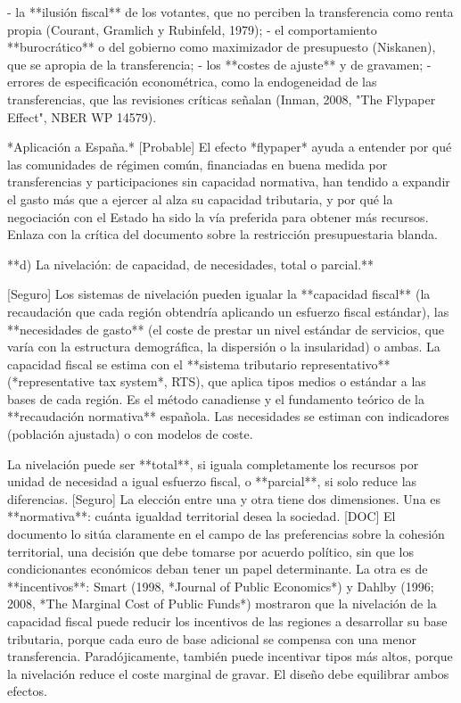 \documentclass[10pt,a4paper]{article}
\begin{document}
- la **ilusión fiscal** de los votantes, que no perciben la transferencia como renta propia (Courant, Gramlich y Rubinfeld, 1979);
- el comportamiento **burocrático** o del gobierno como maximizador de presupuesto (Niskanen), que se apropia de la transferencia;
- los **costes de ajuste** y de gravamen;
- errores de especificación econométrica, como la endogeneidad de las transferencias, que las revisiones críticas señalan (Inman, 2008, "The Flypaper Effect", NBER WP 14579).

*Aplicación a España.* [Probable] El efecto *flypaper* ayuda a entender por qué las comunidades de régimen común, financiadas en buena medida por transferencias y participaciones sin capacidad normativa, han tendido a expandir el gasto más que a ejercer al alza su capacidad tributaria, y por qué la negociación con el Estado ha sido la vía preferida para obtener más recursos. Enlaza con la crítica del documento sobre la restricción presupuestaria blanda.

**d) La nivelación: de capacidad, de necesidades, total o parcial.**

[Seguro] Los sistemas de nivelación pueden igualar la **capacidad fiscal** (la recaudación que cada región obtendría aplicando un esfuerzo fiscal estándar), las **necesidades de gasto** (el coste de prestar un nivel estándar de servicios, que varía con la estructura demográfica, la dispersión o la insularidad) o ambas. La capacidad fiscal se estima con el **sistema tributario representativo** (*representative tax system*, RTS), que aplica tipos medios o estándar a las bases de cada región. Es el método canadiense y el fundamento teórico de la **recaudación normativa** española. Las necesidades se estiman con indicadores (población ajustada) o con modelos de coste.

La nivelación puede ser **total**, si iguala completamente los recursos por unidad de necesidad a igual esfuerzo fiscal, o **parcial**, si solo reduce las diferencias. [Seguro] La elección entre una y otra tiene dos dimensiones. Una es **normativa**: cuánta igualdad territorial desea la sociedad. [DOC] El documento lo sitúa claramente en el campo de las preferencias sobre la cohesión territorial, una decisión que debe tomarse por acuerdo político, sin que los condicionantes económicos deban tener un papel determinante. La otra es de **incentivos**: Smart (1998, *Journal of Public Economics*) y Dahlby (1996; 2008, *The Marginal Cost of Public Funds*) mostraron que la nivelación de la capacidad fiscal puede reducir los incentivos de las regiones a desarrollar su base tributaria, porque cada euro de base adicional se compensa con una menor transferencia. Paradójicamente, también puede incentivar tipos más altos, porque la nivelación reduce el coste marginal de gravar. El diseño debe equilibrar ambos efectos.
\end{document}
